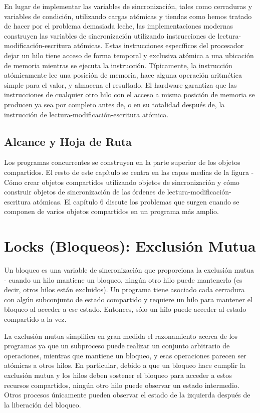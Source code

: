\documentclass[10pt]{book}
\begin{document}
\begin{itemize}
En lugar de implementar las variables de sincronización, tales como cerraduras y variables de condición, utilizando cargas atómicas y tiendas como hemos tratado de hacer por el problema demasiada leche, las implementaciones modernas construyen las variables de sincronización utilizando instrucciones de lectura-modificación-escritura atómicas. Estas instrucciones específicos del procesador dejar un hilo tiene acceso de forma temporal y exclusiva atómica a una ubicación de memoria mientras se ejecuta la instrucción. Típicamente, la instrucción atómicamente lee una posición de memoria, hace alguna operación aritmética simple para el valor, y almacena el resultado. El hardware garantiza que las instrucciones de cualquier otro hilo con el acceso a misma posición de memoria se producen ya sea por completo antes de, o en su totalidad después de, la instrucción de lectura-modificación-escritura atómica.
\end{itemize}

\subsection{Alcance y Hoja de Ruta}
Los programas concurrentes se construyen en la parte superior de los objetos compartidos. El resto de este capítulo se centra en las capas medias de la figura - Cómo crear objetos compartidos utilizando objetos de sincronización y cómo construir objetos de sincronización de las órdenes de lectura-modificación-escritura atómicas. El capítulo 6 discute los problemas que surgen cuando se componen de varios objetos compartidos en un programa más amplio.

\section{Locks (Bloqueos): Exclusión Mutua}
Un bloqueo es una variable de sincronización que proporciona la exclusión mutua - cuando un hilo mantiene un bloqueo, ningún otro hilo puede mantenerlo (es decir, otros hilos están excluidos). Un programa tiene asociado cada cerradura con algún subconjunto de estado compartido y requiere un hilo para mantener el bloqueo al acceder a ese estado. Entonces, sólo un hilo puede acceder al estado compartido a la vez.

La exclusión mutua simplifica en gran medida el razonamiento acerca de los programas ya que un subproceso puede realizar un conjunto arbitrario de operaciones, mientras que mantiene un bloqueo, y esas operaciones parecen ser atómicas a otros hilos. En particular, debido a que un bloqueo hace cumplir la exclusión mutua y los hilos deben sostener el bloqueo para acceder a estos recursos compartidos, ningún otro hilo puede observar un estado intermedio. Otros procesos únicamente pueden observar el estado de la izquierda después de la liberación del bloqueo.
\end{document}
